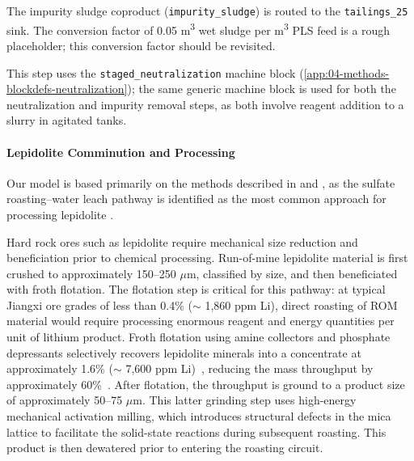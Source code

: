 The impurity sludge coproduct (\texttt{impurity\_sludge}) is routed to the \texttt{tailings\_25} sink. The conversion factor of 0.05 m\textsuperscript{3} wet sludge per m\textsuperscript{3} PLS feed is a rough placeholder; this conversion factor should be revisited.

This step uses the \texttt{staged\_neutralization} machine block (\ref{app:04-methods-blockdefs-neutralization}); the same generic machine block is used for both the neutralization and impurity removal steps, as both involve reagent addition to a slurry in agitated tanks. 

\paragraph{Lepidolite Comminution and Processing}\label{app:04-methods-facilitychoices-lepidproc}

Our model is based primarily on the methods described in \citet{dengSystematicReviewSulfate2026} and \citet{yanExtractionLithiumLepidolite2012}, as the sulfate roasting--water leach pathway is identified as the most common approach for processing lepidolite \citep{gaoLithiumExtractionHard2023, parkEffectiveLithiumExtraction2023, nanMethodsExtractingLithium2019, nanMethodsExtractingLithium2022, zouMethodEfficientLithium2024}.

Hard rock ores such as lepidolite require mechanical size reduction and beneficiation prior to chemical processing. Run-of-mine lepidolite material is first crushed to approximately 150--250 $\mu$m, classified by size, and then beneficiated with froth flotation. The flotation step is critical for this pathway: at typical Jiangxi ore grades of less than 0.4\%  ($\sim$ 1,860 ppm Li), direct roasting of ROM material would require processing enormous reagent and energy quantities per unit of lithium product. Froth flotation using amine collectors and phosphate depressants selectively recovers lepidolite minerals into a concentrate at approximately 1.6\%  ($\sim$ 7,600 ppm Li)~\cite{garrettHandbookLithiumNatural2004, jiaoKeyTechnologiesDevelopment2024}, reducing the mass throughput by approximately 60\%~\citep{jiaoKeyTechnologiesDevelopment2024}. After flotation, the throughput is ground to a product size of approximately 50--75 $\mu$m. This latter grinding step uses high-energy mechanical activation milling, which introduces structural defects in the mica lattice to facilitate the solid-state reactions during subsequent roasting. This product is then dewatered prior to entering the roasting circuit.

